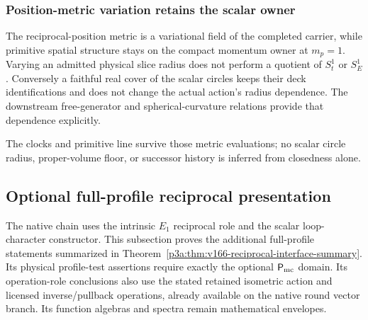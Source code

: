 \documentclass[11pt,a4paper]{article}
\begin{document}
\subsubsection{Position-metric variation retains the scalar owner}
The reciprocal-position metric is a variational field of the completed
carrier, while primitive spatial structure stays on the compact momentum
owner at \(m_p=1\). Varying an admitted physical slice radius does not
perform a quotient of \(S^1_t\) or \(S^1_E\). Conversely a faithful real
cover of the scalar circles keeps their deck identifications and does not
change the actual action's radius dependence. The downstream free-generator
and spherical-curvature relations provide that dependence explicitly.

The clocks and primitive line survive those metric evaluations; no scalar
circle radius, proper-volume floor, or successor history is inferred from
closedness alone.



\subsection{Optional full-profile reciprocal presentation}
\label{p3a:app:v166-full-profile}
The native chain uses the intrinsic \(E_1\) reciprocal role and the
scalar loop-character constructor. This subsection proves the additional
full-profile statements summarized in
Theorem~\ref{p3a:thm:v166-reciprocal-interface-summary}. Its physical
profile-test assertions require exactly the optional \(\mathsf P_{\rm mc}\)
domain. Its operation-role conclusions also use the stated retained isometric
action and licensed inverse/pullback operations, already available on the
native round vector branch. Its function algebras and spectra remain
mathematical envelopes.
\end{document}
